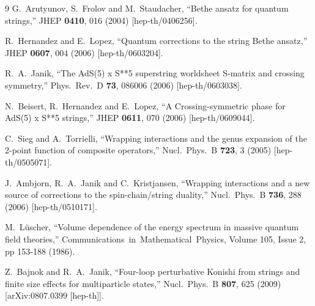 \documentclass[a4paper]{article}
\numberwithin{equation}{section}
\begin{document}
\begin{thebibliography} {9}
  G.~Arutyunov, S.~Frolov and M.~Staudacher,
  ``Bethe ansatz for quantum strings,''
  JHEP {\bf 0410}, 016 (2004)
  [hep-th/0406256].
  
  R.~Hernandez and E.~Lopez,
  ``Quantum corrections to the string Bethe ansatz,''
  JHEP {\bf 0607}, 004 (2006)
  [hep-th/0603204].

  R.~A.~Janik,
  ``The AdS(5) x S**5 superstring worldsheet S-matrix and crossing symmetry,''
  Phys.\ Rev.\ D {\bf 73}, 086006 (2006)
  [hep-th/0603038].
  
  N.~Beisert, R.~Hernandez and E.~Lopez,
  ``A Crossing-symmetric phase for AdS(5) x S**5 strings,''
  JHEP {\bf 0611}, 070 (2006)
  [hep-th/0609044].
  
  C.~Sieg and A.~Torrielli,
  ``Wrapping interactions and the genus expansion of the 2-point function of composite operators,''
  Nucl.\ Phys.\ B {\bf 723}, 3 (2005)
  [hep-th/0505071].
  
  J.~Ambjorn, R.~A.~Janik and C.~Kristjansen,
  ``Wrapping interactions and a new source of corrections to the spin-chain/string duality,''
  Nucl.\ Phys.\ B {\bf 736}, 288 (2006)
  [hep-th/0510171].
  
	M.~L\"{u}scher,
	``Volume dependence of the energy spectrum in massive quantum field theories,''
	Communications\ in\ Mathematical\ Physics, Volume 105, Issue 2, pp 153-188 (1986). 

  Z.~Bajnok and R.~A.~Janik,
  ``Four-loop perturbative Konishi from strings and finite size effects for multiparticle states,''
  Nucl.\ Phys.\ B {\bf 807}, 625 (2009)
  [arXiv:0807.0399 [hep-th]].


\end{thebibliography}
\end{document}
